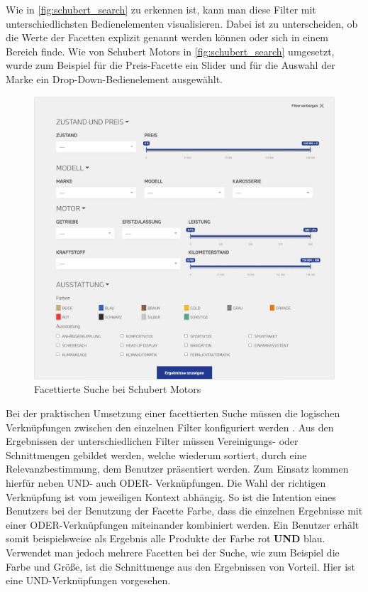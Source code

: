 Wie in \autoref{fig:schubert_search} zu erkennen ist, kann man diese Filter mit unterschiedlichsten Bedienelementen visualisieren. Dabei ist zu unterscheiden, ob die Werte der Facetten explizit genannt werden können oder sich in einem Bereich finde. Wie von Schubert Motors \cite{SchubertMotorsGmbH.2021} in \autoref{fig:schubert_search} umgesetzt, wurde zum Beispiel für die Preis-Facette ein Slider und für die Auswahl der Marke ein Drop-Down-Bedienelement ausgewählt.

\begin{figure}[H]
    \centering
    \includegraphics[width=0.85\linewidth]{images/schubert_search.png}
    \caption{Facettierte Suche bei Schubert Motors \cite{SchubertMotorsGmbH.2021}}
    \label{fig:schubert_search}
\end{figure}

Bei der praktischen Umsetzung einer facettierten Suche müssen die logischen Verknüpfungen zwischen den einzelnen Filter konfiguriert werden \cite{Martin.2018}. Aus den Ergebnissen der unterschiedlichen Filter müssen Vereinigungs- oder Schnittmengen gebildet werden, welche wiederum sortiert, durch eine Relevanzbestimmung, dem Benutzer präsentiert werden. Zum Einsatz kommen hierfür neben \glqq UND\grqq{}- auch \glqq ODER\grqq{}- Verknüpfungen. Die Wahl der richtigen Verknüpfung ist vom jeweiligen Kontext abhängig. So ist die Intention eines Benutzers bei der Benutzung der Facette \glqq Farbe\grqq{}, dass die einzelnen Ergebnisse mit einer ODER-Verknüpfungen miteinander kombiniert werden. Ein Benutzer erhält somit beispielsweise als Ergebnis alle Produkte der Farbe rot \textbf{UND} blau. Verwendet man jedoch mehrere Facetten bei der Suche, wie zum Beispiel die \glqq Farbe\grqq{} und \glqq Größe\grqq{}, ist die Schnittmenge aus den Ergebnissen von Vorteil. Hier ist eine UND-Verknüpfungen vorgesehen.

